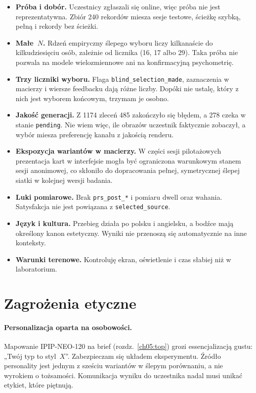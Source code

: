 \begin{itemize}
  \item \textbf{Próba i dobór.} Uczestnicy zgłaszali się online, więc próba nie jest reprezentatywna. Zbiór 240 rekordów miesza sesje testowe, ścieżkę szybką, pełną i rekordy bez ścieżki.
  \item \textbf{Małe~$N$.} Rdzeń empiryczny ślepego wyboru liczy kilkanaście do kilkudziesięciu osób, zależnie od licznika (16, 17 albo 29). Taka próba nie pozwala na modele wielozmiennowe ani na konfirmacyjną psychometrię.
  \item \textbf{Trzy liczniki wyboru.} Flaga \texttt{blind\_selection\_made}, zaznaczenia w macierzy i wiersze feedbacku dają różne liczby. Dopóki nie ustalę, który z nich jest wyborem końcowym, trzymam je osobno.
  \item \textbf{Jakość generacji.} Z 1174 zleceń 485 zakończyło się błędem, a 278 czeka w stanie \texttt{pending}. Nie wiem więc, ile obrazów uczestnik faktycznie zobaczył, a wybór miesza preferencję kanału z jakością renderu.
  \item \textbf{Ekspozycja wariantów w macierzy.} W części sesji pilotażowych prezentacja kart w interfejsie mogła być ograniczona warunkowym stanem sesji anonimowej, co skłoniło do dopracowania pełnej, symetrycznej ślepej siatki w kolejnej wersji badania.
  \item \textbf{Luki pomiarowe.} Brak \texttt{prs\_post\_*} i pomiaru dwell oraz wahania. Satysfakcja nie jest powiązana z \texttt{selected\_source}.
  \item \textbf{Język i kultura.} Przebieg działa po polsku i angielsku, a bodźce mają określony kanon estetyczny. Wyniki nie przenoszą się automatycznie na inne konteksty.
  \item \textbf{Warunki terenowe.} Kontroluję ekran, oświetlenie i czas słabiej niż w laboratorium.
\end{itemize}

\section{Zagrożenia etyczne}
\label{ch09:sec:etyka}

\paragraph{Personalizacja oparta na osobowości.}
Mapowanie IPIP-NEO-120 na brief (rozdz.~\ref{ch05:top}) grozi essencjalizacją gustu: „Twój typ to styl~$X$”. Zabezpieczam się układem eksperymentu. Źródło personality jest jednym z sześciu wariantów w ślepym porównaniu, a nie wyrokiem o tożsamości. Komunikacja wyniku do uczestnika nadal musi unikać etykiet, które piętnują.

